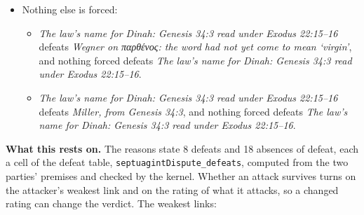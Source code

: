 \documentclass[11pt]{article}
\begin{document}
\begin{itemize}
\begin{itemize}
\item \emph{Miller, from Genesis 34:3} defeats \emph{The laws of the Greek Pentateuch: παρθένος in the sense ‘virgin’}, and \emph{The law’s name for Dinah: Genesis 34:3 read under Exodus 22:15–16} defeats \emph{Miller, from Genesis 34:3}.
\end{itemize}
\item Nothing else is forced:
\begin{itemize}
\item \emph{The law’s name for Dinah: Genesis 34:3 read under Exodus 22:15–16} defeats \emph{Wegner on παρθένος: the word had not yet come to mean ‘virgin’}, and nothing forced defeats \emph{The law’s name for Dinah: Genesis 34:3 read under Exodus 22:15–16}.
\item \emph{The law’s name for Dinah: Genesis 34:3 read under Exodus 22:15–16} defeats \emph{Miller, from Genesis 34:3}, and nothing forced defeats \emph{The law’s name for Dinah: Genesis 34:3 read under Exodus 22:15–16}.
\end{itemize}
\end{itemize}
\par\noindent\textbf{What this rests on.} The reasons state 8 defeats and 18 absences of defeat, each a cell of the defeat table, \texttt{septuagint\allowbreak{}Dispute\_\allowbreak{}defeats}, computed from the two parties' premises and checked by the kernel. Whether an attack survives turns on the attacker's weakest link and on the rating of what it attacks, so a changed rating can change the verdict. The weakest links:
\end{document}
